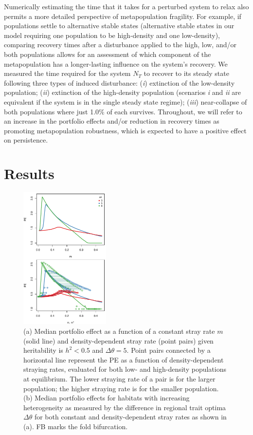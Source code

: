 \documentclass[twocolumn,preprintnumbers,amsmath,amssymb,superscriptaddress]{revtex4}
\begin{document}
Numerically estimating the time that it takes for a perturbed system to relax also permits a more detailed perspective of metapopulation fragility.
For example, if populations settle to alternative stable states (alternative stable states in our model requiring one population to be high-density and one low-density), comparing recovery times after a disturbance applied to the high, low, and/or both populations allows for an assessment of which component of the metapopulation has a longer-lasting influence on the system's recovery.
We measured the time required for the system $N_T$ to recover to its steady state following three types of induced disturbance: (\emph{i}) extinction of the low-density population; (\emph{ii}) extinction of the high-density population (scenarios \emph{i} and \emph{ii} are equivalent if the system is in the single steady state regime); (\emph{iii}) near-collapse of both populations where just 1.0\% of each survives.
Throughout, we will refer to an increase in the portfolio effects and/or reduction in recovery times as promoting metapopulation robustness, which is expected to have a positive effect on persistence.
\\


\section{Results}


\begin{figure}
  \captionsetup{justification=raggedright,
singlelinecheck=false
}
\centering
\includegraphics[width=0.4\textwidth]{figs2/fig_thetaPEmvm.pdf}
\caption{
(a) Median portfolio effect as a function of a constant stray rate $m$ (solid line) and density-dependent stray rate (point pairs) given heritability is $h^2 < 0.5$ and $\Delta\theta=5$.
Point pairs connected by a horizontal line represent the PE as a function of density-dependent straying rates, evaluated for both low- and high-density populations at equilibrium. The lower straying rate of a pair is for the larger population; the higher straying rate is for the smaller population.
(b) Median portfolio effects for habitats with increasing heterogeneity as measured by the difference in regional trait optima $\Delta \theta$ for both constant and density-dependent stray rates as shown in (a).
FB marks the fold bifurcation.
} \label{fig:thetaPE}
\end{figure}
\end{document}
